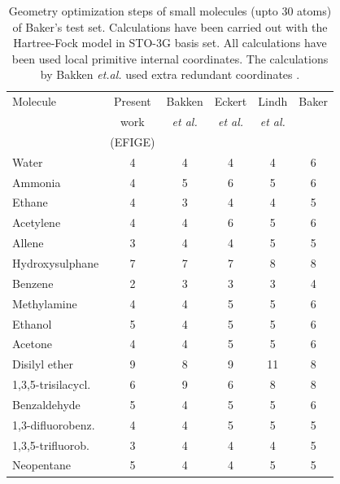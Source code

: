 \documentclass[prl,aps,twocolumn,showpacs,twocolumngrid,superbib]{revtex4}
\begin{document}
\begin{table}[h]
\caption{
Geometry optimization steps of small molecules (upto 30 atoms)
of Baker's test set. Calculations have been carried out 
with the Hartree-Fock model in STO-3G basis set.
All calculations have been used local primitive
internal coordinates. The calculations 
by Bakken {\it et.al.} used extra redundant coordinates \cite{bakken}.
}
\label{Bakers_test}
\begin{tabular}{lccccc}
\toprule
Molecule               & Present  & Bakken & Eckert  & Lindh &  Baker  \\
         & work & {\it{et al.}} & {\it{et al.}} & {\it{et al.}} &    \\
         &(EFIGE) &  \cite{bakken} &  \cite{eckert} & \cite{lindh} &  \cite{bakerstest} \\
\colrule
Water                  &   4    &   4    &    4    &    4   &   6     \\
Ammonia                &   4    &   5    &    6    &    5   &   6     \\
Ethane                 &   4    &   3    &    4    &    4   &   5     \\
Acetylene              &   4    &   4    &    6    &    5   &   6     \\
Allene                 &   3    &   4    &    4    &    5   &   5     \\
Hydroxysulphane        &   7    &   7    &    7    &    8   &   8     \\
Benzene                &   2    &   3    &    3    &    3   &   4     \\
Methylamine            &   4    &   4    &    5    &    5   &   6     \\
Ethanol                &   5    &   4    &    5    &    5   &   6     \\
Acetone                &   4    &   4    &    5    &    5   &   6     \\
Disilyl ether          &   9    &   8    &    9    &   11   &   8     \\
1,3,5-trisilacycl.     &   6    &   9    &    6    &    8   &   8     \\
Benzaldehyde           &   5    &   4    &    5    &    5   &   6     \\
1,3-difluorobenz.      &   4    &   4    &    5    &    5   &   5     \\
1,3,5-trifluorob.      &   3    &   4    &    4    &    4   &   5     \\
Neopentane             &   5    &   4    &    4    &    5   &   5     \\

\end{tabular}
\end{table}
\end{document}
